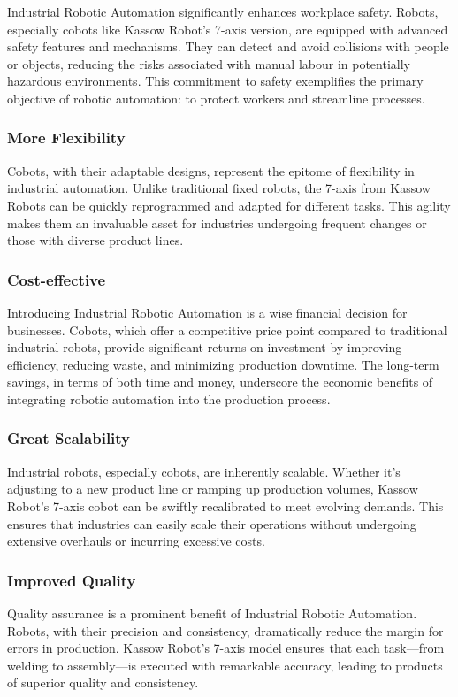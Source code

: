 Industrial Robotic Automation significantly enhances workplace safety. Robots, especially cobots like Kassow Robot's 7-axis version, are equipped with advanced safety features and mechanisms. 
They can detect and avoid collisions with people or objects, reducing the risks associated with manual labour in potentially hazardous environments. This commitment to safety exemplifies the primary objective of robotic automation: to protect workers and streamline processes.

\subsubsection{More Flexibility}
Cobots, with their adaptable designs, represent the epitome of flexibility in industrial automation. 
Unlike traditional fixed robots, the 7-axis from Kassow Robots can be quickly reprogrammed and adapted for different tasks. This agility makes them an invaluable asset for industries undergoing frequent changes or those with diverse product lines.

\subsubsection{Cost-effective}
Introducing Industrial Robotic Automation is a wise financial decision for businesses. Cobots, which offer a competitive price point compared to traditional industrial robots, provide significant returns on investment by improving efficiency, reducing waste, and minimizing production downtime. 
The long-term savings, in terms of both time and money, underscore the economic benefits of integrating robotic automation into the production process.

\subsubsection{Great Scalability}
Industrial robots, especially cobots, are inherently scalable. Whether it's adjusting to a new product line or ramping up production volumes, Kassow Robot's 7-axis cobot can be swiftly recalibrated to meet evolving demands. 
This ensures that industries can easily scale their operations without undergoing extensive overhauls or incurring excessive costs.

\subsubsection{Improved Quality}
Quality assurance is a prominent benefit of Industrial Robotic Automation. Robots, with their precision and consistency, dramatically reduce the margin for errors in production. 
Kassow Robot's 7-axis model ensures that each task—from welding to assembly—is executed with remarkable accuracy, leading to products of superior quality and consistency.

